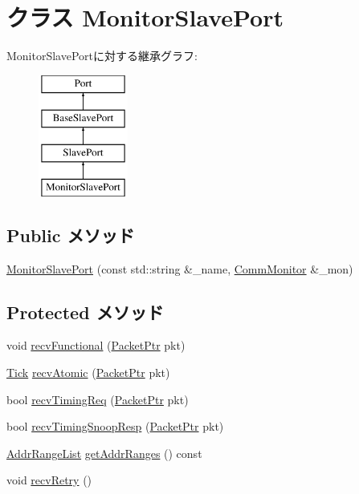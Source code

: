 \hypertarget{classCommMonitor_1_1MonitorSlavePort}{
\section{クラス MonitorSlavePort}
\label{classCommMonitor_1_1MonitorSlavePort}
}
MonitorSlavePortに対する継承グラフ:\begin{figure}[H]
\begin{center}
\leavevmode
\includegraphics[height=4cm]{classCommMonitor_1_1MonitorSlavePort}
\end{center}
\end{figure}
\subsection*{Public メソッド}
\begin{DoxyCompactItemize}
\item 
\hyperlink{classCommMonitor_1_1MonitorSlavePort_ae614e8a09ac75ea9a97dcab60aa60099}{MonitorSlavePort} (const std::string \&\_\-name, \hyperlink{classCommMonitor_1_1CommMonitor}{CommMonitor} \&\_\-mon)
\end{DoxyCompactItemize}
\subsection*{Protected メソッド}
\begin{DoxyCompactItemize}
\item 
void \hyperlink{classCommMonitor_1_1MonitorSlavePort_aeefa907fb6d6a787e6dab90e8138ea90}{recvFunctional} (\hyperlink{classPacket}{PacketPtr} pkt)
\item 
\hyperlink{base_2types_8hh_a5c8ed81b7d238c9083e1037ba6d61643}{Tick} \hyperlink{classCommMonitor_1_1MonitorSlavePort_a5f0b4c4a94f6b0053f9d7a4eb9c2518a}{recvAtomic} (\hyperlink{classPacket}{PacketPtr} pkt)
\item 
bool \hyperlink{classCommMonitor_1_1MonitorSlavePort_a3344d9dd0f83257feab5424e761f31c6}{recvTimingReq} (\hyperlink{classPacket}{PacketPtr} pkt)
\item 
bool \hyperlink{classCommMonitor_1_1MonitorSlavePort_a9b643d565edc21dac11ce15a560238a7}{recvTimingSnoopResp} (\hyperlink{classPacket}{PacketPtr} pkt)
\item 
\hyperlink{classstd_1_1list}{AddrRangeList} \hyperlink{classCommMonitor_1_1MonitorSlavePort_a36cf113d5e5e091ebddb32306c098fae}{getAddrRanges} () const 
\item 
void \hyperlink{classCommMonitor_1_1MonitorSlavePort_a29cb5a4f98063ce6e9210eacbdb35298}{recvRetry} ()
\end{DoxyCompactItemize}
